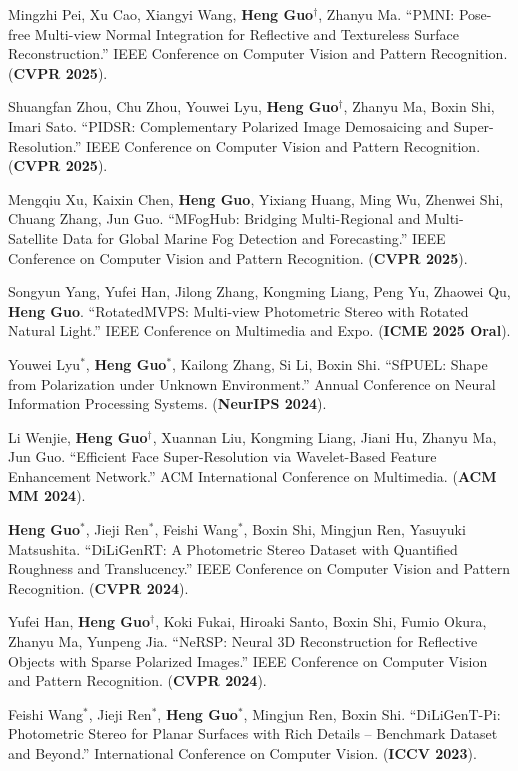\begin{enumerate}[label={[\arabic*]}]
	\item Mingzhi Pei, Xu Cao, Xiangyi Wang, \textbf{Heng Guo}$^\dagger$, Zhanyu Ma. ``PMNI: Pose-free Multi-view Normal Integration for Reflective and Textureless Surface Reconstruction.'' IEEE Conference on Computer Vision and Pattern Recognition. (\textbf{CVPR 2025}).
	\item Shuangfan Zhou, Chu Zhou, Youwei Lyu, \textbf{Heng Guo}$^\dagger$, Zhanyu Ma, Boxin Shi, Imari Sato. ``PIDSR: Complementary Polarized Image Demosaicing and Super-Resolution.'' IEEE Conference on Computer Vision and Pattern Recognition. (\textbf{CVPR 2025}).
	\item Mengqiu Xu, Kaixin Chen, \textbf{Heng Guo}, Yixiang Huang, Ming Wu, Zhenwei Shi, Chuang Zhang, Jun Guo. ``MFogHub: Bridging Multi-Regional and Multi-Satellite Data for Global Marine Fog Detection and Forecasting.'' IEEE Conference on Computer Vision and Pattern Recognition. (\textbf{CVPR 2025}).
	\item Songyun Yang, Yufei Han, Jilong Zhang, Kongming Liang, Peng Yu, Zhaowei Qu, \textbf{Heng Guo}. ``RotatedMVPS: Multi-view Photometric Stereo with Rotated Natural Light.'' IEEE Conference on Multimedia and Expo. (\textbf{ICME 2025 \color{red}Oral}).
	\item Youwei Lyu$^*$, \textbf{Heng Guo}$^*$, Kailong Zhang, Si Li, Boxin Shi. ``SfPUEL: Shape from Polarization under Unknown Environment.'' Annual Conference on Neural Information Processing Systems. (\textbf{NeurIPS 2024}).
	\item Li Wenjie, \textbf{Heng Guo}$^\dagger$, Xuannan Liu, Kongming Liang, Jiani Hu, Zhanyu Ma, Jun Guo. ``Efficient Face Super-Resolution via Wavelet-Based Feature Enhancement Network.'' ACM International Conference on Multimedia. (\textbf{ACM MM 2024}).
	\item \textbf{Heng Guo}$^*$, Jieji Ren$^*$, Feishi Wang$^*$, Boxin Shi, Mingjun Ren, Yasuyuki Matsushita. ``DiLiGenRT: A Photometric Stereo Dataset with Quantified Roughness and Translucency.'' IEEE Conference on Computer Vision and Pattern Recognition. (\textbf{CVPR 2024}).
	\item Yufei Han, \textbf{Heng Guo$^\dagger$}, Koki Fukai, Hiroaki Santo, Boxin Shi, Fumio Okura, Zhanyu Ma, Yunpeng Jia. ``NeRSP: Neural 3D Reconstruction for Reflective Objects with Sparse Polarized Images.'' IEEE Conference on Computer Vision and Pattern Recognition. (\textbf{CVPR 2024}).
	\item Feishi Wang$^*$, Jieji Ren$^*$, \textbf{Heng Guo}$^*$, Mingjun Ren, Boxin Shi. ``DiLiGenT-Pi: Photometric Stereo for Planar Surfaces with Rich Details – Benchmark Dataset and Beyond.'' International Conference on Computer Vision. (\textbf{ICCV 2023}).

\end{enumerate}
